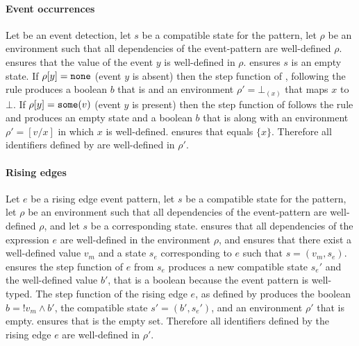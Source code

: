 \begin{skippableproof}
    \paragraph{Event occurrences}
    Let  be an event detection, let $s$ be a compatible state for the pattern, let
    $\rho$ be an environment such that all dependencies of the event-pattern are well-defined $\rho$.
     ensures that the value of
    the event $y$ is well-defined in $\rho$.
     ensures $s$ is an empty state.
    If $\rho[y] = \mathtt{{none}}$ (event $y$ is absent) then the step function of ,
    following the rule  produces a boolean
    $b$ that is \false and an environment $\rho' = \bot_{(x)}$ that maps $x$ to $\bot$.
    If $\rho[y] = \mathtt{{some}}(v)$ (event $y$ is present) then the step function of 
    follows the rule  and produces an empty
    state and a boolean $b$ that is \true along with an environment $\rho' = [v / x]$ in which
    $x$ is well-defined.
     ensures that  equals
    $\{ x \}$. Therefore all identifiers defined by  are well-defined in $\rho'$.

    \paragraph{Rising edges}
    Let $e$ be a rising edge event pattern, let $s$ be a compatible state for the pattern, let
    $\rho$ be an environment such that all dependencies of the event-pattern are well-defined $\rho$,
    and let $s$ be a corresponding state.
     ensures that all dependencies
    of the expression $e$ are well-defined in the environment $\rho$, and
     ensures that there exist a well-defined
    value $v_m$ and a state $s_e$ corresponding to $e$ such that $s = (v_m, s_e)$.
     ensures the step function of $e$ from $s_e$ produces a new compatible state
    $s_e'$ and the well-defined value $b'$, that is a boolean because the event pattern is
    well-typed. The step function of the rising edge $e$, as defined by
     produces the boolean
    $b = !v_m \wedge b'$, the compatible state $s' = (b', s_e')$, and an environment $\rho'$ that is
    empty.  ensures that  is the empty
    set. Therefore all identifiers defined by the rising edge $e$ are well-defined in $\rho'$.

    \setcounter{paragraph}{0}
\end{skippableproof}

